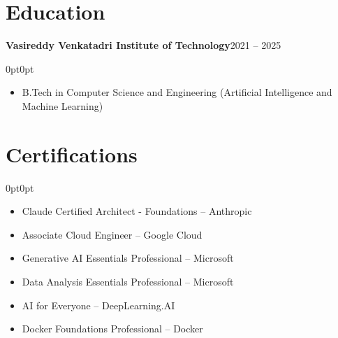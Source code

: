 \documentclass[10pt, letterpaper]{article}
\newenvironment{onecolentry}{
    \begin{adjustwidth}{0pt}{0pt}
}{
    \end{adjustwidth}
}
\newenvironment{highlights}{
    \begin{itemize}[topsep=2pt, parsep=0pt, partopsep=0pt, itemsep=2pt, leftmargin=0.8cm]
}{
    \end{itemize}
}
\newcommand{\headerrow}[2]{%
    \noindent\textbf{#1}\hfill #2\par%
}
\begin{document}
\section{Education}

\headerrow{Vasireddy Venkatadri Institute of Technology}{2021 -- 2025}

\vspace{-2pt}
\begin{onecolentry}
\begin{highlights}
    \item B.Tech in Computer Science and Engineering (Artificial Intelligence and Machine Learning)
\end{highlights}
\end{onecolentry}

\section{Certifications}
\begin{onecolentry}
\begin{highlights}
    \item Claude Certified Architect - Foundations -- Anthropic
    \item Associate Cloud Engineer -- Google Cloud
    \item Generative AI Essentials Professional -- Microsoft
    \item Data Analysis Essentials Professional -- Microsoft
    \item AI for Everyone -- DeepLearning.AI
    \item Docker Foundations Professional -- Docker
\end{highlights}
\end{onecolentry}
\end{document}
